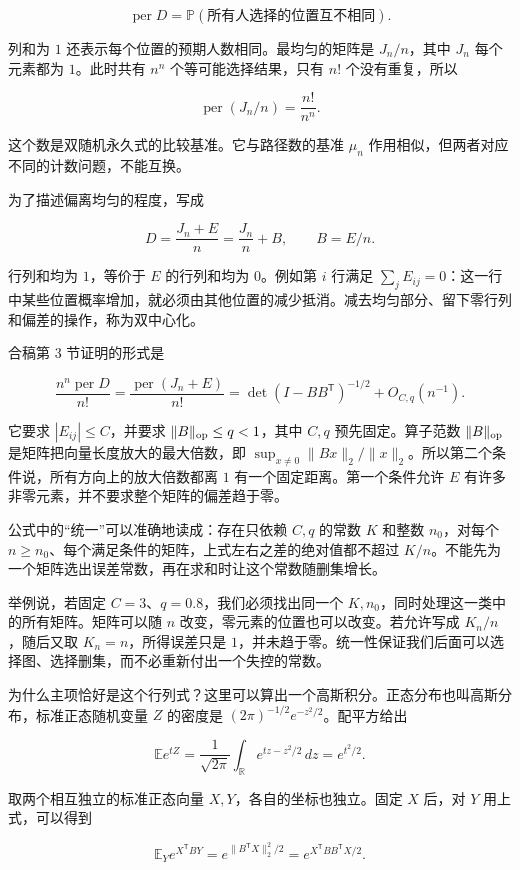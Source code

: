 \documentclass[11pt,a4paper]{article}
\begin{document}
\[\operatorname{per}D
=\mathbb P(\text{所有人选择的位置互不相同}).\]

列和为 \(1\) 还表示每个位置的预期人数相同。最均匀的矩阵是 \(J_n/n\)，其中 \(J_n\) 每个元素都为 \(1\)。此时共有 \(n^n\) 个等可能选择结果，只有 \(n!\) 个没有重复，所以

\[\operatorname{per}(J_n/n)=\frac{n!}{n^n}.\]

这个数是双随机永久式的比较基准。它与路径数的基准 \(\mu_n\) 作用相似，但两者对应不同的计数问题，不能互换。

为了描述偏离均匀的程度，写成

\[D=\frac{J_n+E}{n}=\frac{J_n}{n}+B,
\qquad B=E/n.\]

行列和均为 \(1\)，等价于 \(E\) 的行列和均为 \(0\)。例如第 \(i\) 行满足 \(\sum_jE_{ij}=0\)：这一行中某些位置概率增加，就必须由其他位置的减少抵消。减去均匀部分、留下零行列和偏差的操作，称为双中心化。

合稿第 3 节证明的形式是

\[\frac{n^n\operatorname{per}D}{n!}
=\frac{\operatorname{per}(J_n+E)}{n!}
=\det(I-BB^{\mathsf T})^{-1/2}+O_{C,q}(n^{-1}).\]

它要求 \(|E_{ij}|\le C\)，并要求 \(\|B\|_{\rm op}\le q<1\)，其中 \(C,q\) 预先固定。算子范数 \(\|B\|_{\rm op}\) 是矩阵把向量长度放大的最大倍数，即 \(\sup_{x\ne0}\|Bx\|_2/\|x\|_2\)。所以第二个条件说，所有方向上的放大倍数都离 \(1\) 有一个固定距离。第一个条件允许 \(E\) 有许多非零元素，并不要求整个矩阵的偏差趋于零。

公式中的``统一''可以准确地读成：存在只依赖 \(C,q\) 的常数 \(K\) 和整数 \(n_0\)，对每个 \(n\ge n_0\)、每个满足条件的矩阵，上式左右之差的绝对值都不超过 \(K/n\)。不能先为一个矩阵选出误差常数，再在求和时让这个常数随删集增长。

举例说，若固定 \(C=3\)、\(q=0.8\)，我们必须找出同一个 \(K,n_0\)，同时处理这一类中的所有矩阵。矩阵可以随 \(n\) 改变，零元素的位置也可以改变。若允许写成 \(K_n/n\)，随后又取 \(K_n=n\)，所得误差只是 \(1\)，并未趋于零。统一性保证我们后面可以选择图、选择删集，而不必重新付出一个失控的常数。

为什么主项恰好是这个行列式？这里可以算出一个高斯积分。正态分布也叫高斯分布，标准正态随机变量 \(Z\) 的密度是 \((2\pi)^{-1/2}e^{-z^2/2}\)。配平方给出

\[\mathbb E e^{tZ}
=\frac1{\sqrt{2\pi}}\int_{\mathbb R}e^{tz-z^2/2}\,dz
=e^{t^2/2}.\]

取两个相互独立的标准正态向量 \(X,Y\)，各自的坐标也独立。固定 \(X\) 后，对 \(Y\) 用上式，可以得到

\[\mathbb E_Y e^{X^{\mathsf T}BY}
=e^{\|B^{\mathsf T}X\|_2^2/2}
=e^{X^{\mathsf T}BB^{\mathsf T}X/2}.\]
\end{document}
